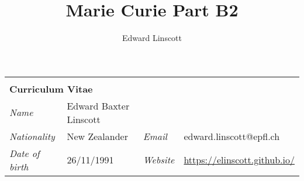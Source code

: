 \documentclass[10pt,a4paper,final]{article}
\author{Edward Linscott}
\title{Marie Curie Part B2}
\begin{document}
\begin{tabularx}{\textwidth}{
      m{}%
      m{}%
      m{}%
      m{}}
   \multicolumn{4}{l}{\cellcolor{seaborn_red}}                                                             \\[-1.5em]
   \multicolumn{4}{l}{\cellcolor{seaborn_red}%
      \Huge\textbf{\textcolor{seaborn_bg_grey_half}{Curriculum Vitae}%
      }}                                                                                                   \\
   \textit{Name         } & Edward Baxter Linscott &                  &                                    \\
   \textit{Nationality  } & New Zealander          & \textit{Email  } & edward.linscott@epfl.ch            \\
   \textit{Date of birth} & 26/11/1991             & \textit{Website} & \url{https://elinscott.github.io/} \\
\end{tabularx}
\end{document}
